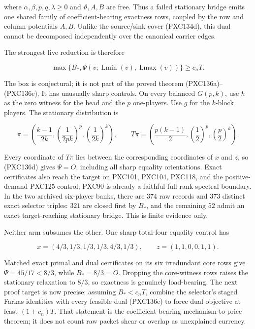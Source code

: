 \documentclass[11pt]{article}
\newcommand{\Lmin}{\operatorname{Lmin}}
\newcommand{\Lmax}{\operatorname{Lmax}}
\begin{document}
where \(\alpha,\beta,p,q,\lambda\ge0\) and
\(\vartheta,A,B\) are free.  Thus a failed stationary bridge emits one
shared family of coefficient-bearing exactness rows, coupled by the row and
column potentials \(A,B\).  Unlike the source/sink cover (PXC134d), this
dual cannot be decomposed independently over the canonical carrier edges.

The strongest live reduction is therefore

\[
 \boxed{\quad \max\{B_*,\Psi(v;\Lmin(v),\Lmax(v))\}\ge c_nT.\quad}       \tag{PXC136?}
\]

The box is conjectural; it is not part of the proved theorem
(PXC136a)--(PXC136e).  It has unusually sharp controls.  On every balanced
\(G(p,k)\), use \(h\) as the zero witness for the head and the \(p\)
one-players.  Use \(g\) for the \(k\)-block players.  The stationary
distribution is

\[
 \pi=\left(\frac{k-1}{2k},
        \left(\frac1{2pk}\right)^p,
        \left(\frac1{2k}\right)^k\right),\qquad
 T\pi=\left(\frac{p(k-1)}2,
        \left(\frac12\right)^p,
        \left(\frac p2\right)^k\right).
\]

Every coordinate of \(T\pi\) lies between the corresponding coordinates of
\(x\) and \(z\), so (PXC136d) gives \(\Psi=O\), including all sharp equality
orientations.  Exact certificates also reach the target on PXC101, PXC104,
PXC118, and the positive-demand PXC125 control; PXC90 is already a faithful
full-rank spectral boundary.  In the two archived six-player banks, there
are \(374\) raw records and \(373\) distinct exact selector triples: \(321\)
are closed first by \(B_*\), and the remaining \(52\) admit an exact
target-reaching stationary bridge.  This is finite evidence only.

Neither arm subsumes the other.  One sharp total-four equality control has

\[
 x=(4/3,1/3,1/3,1/3,4/3,1/3),\qquad
 z=(1,1,0,0,1,1).
\]

Matched exact primal and dual certificates on its six irredundant core rows
give \(\Psi=45/17<8/3\), while \(B_*=8/3=O\).  Dropping the core-witness
rows raises the stationary relaxation to \(8/3\), so exactness is genuinely
load-bearing.  The next proof target is now precise: assuming \(B_*<c_nT\),
combine the selector's staged Farkas identities with every feasible dual
(PXC136e) to force dual objective at least \((1+c_n)T\).  That statement is
the coefficient-bearing mechanism-to-price theorem; it does not count raw
packet shear or overlap as unexplained currency.
\end{document}
